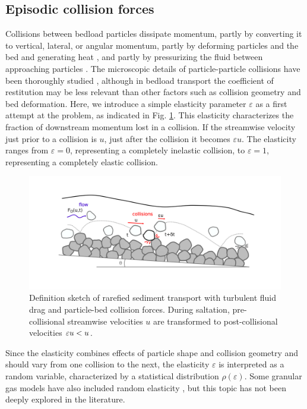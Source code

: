 \subsection{Episodic collision forces}
Collisions between bedload particles dissipate momentum, partly by converting it to vertical, lateral, or angular momentum, partly by deforming particles and the bed and generating heat \citep{Schmeeckle2014,Williams2021}, and partly by pressurizing the fluid between approaching particles \citep{Joseph2001,Schmeeckle2001}. 
The microscopic details of particle-particle collisions have been thoroughly studied \citep{Brach1989, Lorenz1997,Montaine2011}, although in bedload transport the coefficient of restitution may be less relevant than other factors such as collision geometry and bed deformation. Here, we introduce a simple elasticity parameter $\varepsilon$ as a first attempt at the problem, as indicated in Fig. \ref{fig:fig1}. This elasticity characterizes the fraction of downstream momentum lost in a collision. If the streamwise velocity just prior to a collision is $u$, just after the collision it becomes $\varepsilon u$. The elasticity ranges from $\varepsilon=0$, representing a completely inelastic collision, to $\varepsilon=1$, representing a completely elastic collision.
\begin{figure}
	\centerline{\includegraphics{./figures/ch5/Fig1Concept.png}}
	\caption{Definition sketch of rarefied sediment transport with turbulent fluid drag and particle-bed collision forces. During saltation, pre-collisional streamwise velocities $u$ are transformed to post-collisional velocities $\varepsilon u < u$.}
	\label{fig:fig1}
\end{figure}

Since the elasticity combines effects of particle shape and collision geometry and should vary from one collision to the next, the elasticity $\varepsilon$ is interpreted as a random variable, characterized by a statistical distribution $\rho(\varepsilon)$.
Some granular gas models have also included random elasticity \citep[e.g.][]{Serero2015}, but this topic has not been deeply explored in the literature.

